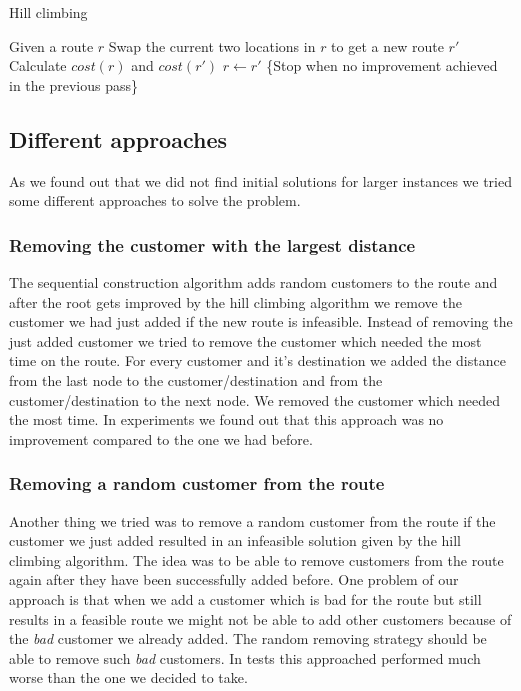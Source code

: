 \documentclass[fleqn]{scrartcl}
\begin{document}
\begin{algorithm}
\caption{Hill climbing}
\label{algo:hillclimb}
\begin{algorithmic}[1]
\State Given a route $r$
\Repeat
{}
\State Swap the current two locations in $r$ to get a new route $r'$
\State Calculate $cost(r)$ and $cost(r')$
\State $r \gets r'$
\EndIf
\EndIf
\EndFor
{} \{Stop when no improvement achieved in the previous pass\}
\end{algorithmic}
\end{algorithm}

\subsection{Different approaches}

As we found out that we did not find initial solutions for larger instances we tried some different approaches to solve the problem.

\subsubsection{Removing the customer with the largest distance}
The sequential construction algorithm adds random customers to the route and after the root gets improved by the hill climbing algorithm we remove the customer we had just added if the new route is infeasible. Instead of removing the just added customer we tried to remove the customer which needed the most time on the route. For every customer and it's destination we added the distance from the last node to the customer/destination and from the customer/destination to the next node. We removed the customer which needed the most time. In experiments we found out that this approach was no improvement compared to the one we had before.

\subsubsection{Removing a random customer from the route}
Another thing we tried was to remove a random customer from the route if the customer we just added resulted in an infeasible solution given by the hill climbing algorithm. The idea was to be able to remove customers from the route again after they have been successfully added before. One problem of our approach is that when we add a customer which is bad for the route but still results in a feasible route we might not be able to add other customers because of the \textit{bad} customer we already added. The random removing strategy should be able to remove such \textit{bad} customers. In tests this approached performed much worse than the one we decided to take.
\end{document}
